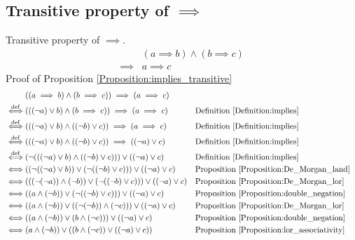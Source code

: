 \subsection{Transitive property of $\implies$}
\begin{prop}
\label{Proposition:implies_transitive}
Transitive property of $\implies$.
\begin{align*}
& (a \implies b) \land (b \implies c) \\
\implies & a \implies c
\end{align*}
Proof of Proposition \ref{Proposition:implies_transitive}
\begin{align*}
& ((a \implies b) \land (b \implies c)) \implies (a \implies c) \\
\overset{\operatorname{def}}{\iff} & (((\lnot a) \lor b) \land (b \implies c)) \implies (a \implies c)
& & \text{Definition \ref{Definition:implies}} \\
\overset{\operatorname{def}}{\iff} & (((\lnot a) \lor b) \land ((\lnot b) \lor c)) \implies (a \implies c)
& & \text{Definition \ref{Definition:implies}} \\
\overset{\operatorname{def}}{\iff} & (((\lnot a) \lor b) \land ((\lnot b) \lor c)) \implies ((\lnot a) \lor c)
& & \text{Definition \ref{Definition:implies}} \\
\overset{\operatorname{def}}{\iff} & (\lnot (((\lnot a) \lor b) \land ((\lnot b) \lor c))) \lor ((\lnot a) \lor c)
& & \text{Definition \ref{Definition:implies}} \\
\iff & ((\lnot ((\lnot a) \lor b)) \lor (\lnot ((\lnot b) \lor c))) \lor ((\lnot a) \lor c)
& & \text{Proposition \ref{Proposition:De_Morgan_land}} \\
\iff & (((\lnot (\lnot a)) \land (\lnot b)) \lor (\lnot ((\lnot b) \lor c))) \lor ((\lnot a) \lor c)
& & \text{Proposition \ref{Proposition:De_Morgan_lor}} \\
\iff & ((a \land (\lnot b)) \lor (\lnot ((\lnot b) \lor c))) \lor ((\lnot a) \lor c)
& & \text{Proposition \ref{Proposition:double_negation}} \\
\iff & ((a \land (\lnot b)) \lor ((\lnot (\lnot b)) \land (\lnot c))) \lor ((\lnot a) \lor c)
& & \text{Proposition \ref{Proposition:De_Morgan_lor}} \\
\iff & ((a \land (\lnot b)) \lor (b \land (\lnot c))) \lor ((\lnot a) \lor c)
& & \text{Proposition \ref{Proposition:double_negation}} \\
\iff & (a \land (\lnot b)) \lor ((b \land (\lnot c)) \lor ((\lnot a) \lor c))
& & \text{Proposition \ref{Proposition:lor_associativity}} \\

\end{align*}
\end{prop}
